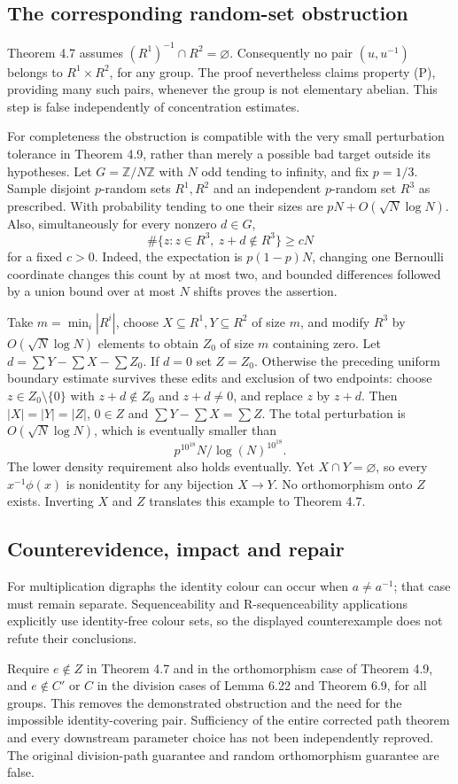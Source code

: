 \documentclass[10pt]{article}
\begin{document}
\subsection*{The corresponding random-set obstruction}
Theorem 4.7 assumes \((R^1)^{-1}\cap R^2=\varnothing\). Consequently no pair \((u,u^{-1})\) belongs to \(R^1\times R^2\), for any group. The proof nevertheless claims property (P), providing many such pairs, whenever the group is not elementary abelian. This step is false independently of concentration estimates.\par
For completeness the obstruction is compatible with the very small perturbation tolerance in Theorem 4.9, rather than merely a possible bad target outside its hypotheses. Let \(G=\mathbb Z/N\mathbb Z\) with \(N\) odd tending to infinity, and fix \(p=1/3\). Sample disjoint \(p\)-random sets \(R^1,R^2\) and an independent \(p\)-random set \(R^3\) as prescribed. With probability tending to one their sizes are \(pN+O(\sqrt N\log N)\). Also, simultaneously for every nonzero \(d\in G\), \[\#\{z:z\in R^3,\ z+d\notin R^3\}\geq cN\] for a fixed \(c>0\). Indeed, the expectation is \(p(1-p)N\), changing one Bernoulli coordinate changes this count by at most two, and bounded differences followed by a union bound over at most \(N\) shifts proves the assertion.\par
Take \(m=\min_i|R^i|\), choose \(X\subseteq R^1,Y\subseteq R^2\) of size \(m\), and modify \(R^3\) by \(O(\sqrt N\log N)\) elements to obtain \(Z_0\) of size \(m\) containing zero. Let \(d=\sum Y-\sum X-\sum Z_0\). If \(d=0\) set \(Z=Z_0\). Otherwise the preceding uniform boundary estimate survives these edits and exclusion of two endpoints: choose \(z\in Z_0\setminus\{0\}\) with \(z+d\notin Z_0\) and \(z+d\neq0\), and replace \(z\) by \(z+d\). Then \(|X|=|Y|=|Z|\), \(0\in Z\) and \(\sum Y-\sum X=\sum Z\). The total perturbation is \(O(\sqrt N\log N)\), which is eventually smaller than \[p^{10^{18}}N/\log(N)^{10^{18}}.\] The lower density requirement also holds eventually. Yet \(X\cap Y=\varnothing\), so every \(x^{-1}\phi(x)\) is nonidentity for any bijection \(X\to Y\). No orthomorphism onto \(Z\) exists. Inverting \(X\) and \(Z\) translates this example to Theorem 4.7.\par
\subsection*{Counterevidence, impact and repair}
For multiplication digraphs the identity colour can occur when \(a\neq a^{-1}\); that case must remain separate. Sequenceability and R-sequenceability applications explicitly use identity-free colour sets, so the displayed counterexample does not refute their conclusions.\par
Require \(e\notin Z\) in Theorem 4.7 and in the orthomorphism case of Theorem 4.9, and \(e\notin C'\) or \(C\) in the division cases of Lemma 6.22 and Theorem 6.9, for all groups. This removes the demonstrated obstruction and the need for the impossible identity-covering pair. Sufficiency of the entire corrected path theorem and every downstream parameter choice has not been independently reproved. The original division-path guarantee and random orthomorphism guarantee are false.\par
\end{document}
